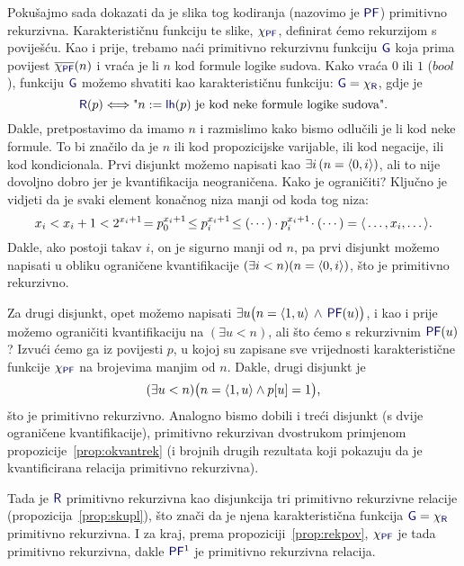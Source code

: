 \begin{primjer}[{name=[primitivna rekurzivnost skupa svih formula logike sudova]}]
Pokušajmo sada dokazati da je slika tog kodiranja (nazovimo je $\f{PF}$) primitivno rekurzivna. Karakterističnu funkciju te slike, $\chi_{\f{PF}}$, definirat ćemo rekurzijom s poviješću. Kao i prije, trebamo naći primitivno rekurzivnu funkciju $\f G$ koja prima povijest $\overline{\chi_{\f{PF}}}(n)$ i vraća je li $n$ kod formule logike sudova. Kako vraća $0$ ili $1$ ($bool$), funkciju $\f G$ možemo shvatiti kao karakterističnu funkciju: $\f G=\chi_{\f R}$, gdje je
\begin{equation}
    \f R(p)\Longleftrightarrow\text{"$n:=\f{lh}(p)$ je kod neke formule logike sudova".}
\end{equation}
	Dakle, pretpostavimo da imamo $n$ i razmislimo kako bismo odlučili je li kod neke formule. To bi značilo da je $n$ ili kod propozicijske varijable, ili kod negacije, ili kod kondicionala. Prvi disjunkt možemo napisati kao $\exists i\,(n=\langle0,i\rangle)$, ali to nije dovoljno dobro jer je kvantifikacija neograničena. Kako je ograničiti? Ključno je vidjeti da je svaki element konačnog niza manji od koda tog niza:
\begin{equation}\label{eq:elem<kod}
    x_i<x_i+1<2^{x_i+1}\!=p_0^{x_i+1}\!\le p_i^{x_i+1}\!\le(\cdots)\cdot p_i^{x_i+1}\!\cdot(\cdots)=\langle\,\dotsc,x_i,\dotsc\rangle\text.
\end{equation}
Dakle, ako postoji takav $i$, on je sigurno manji od $n$, pa prvi disjunkt možemo napisati u obliku ograničene kvantifikacije $(\exists i<n)(n=\langle0,i\rangle)$, što je primitivno rekurzivno.

    Za drugi disjunkt, opet možemo napisati $\exists u\bigl(n\eq\langle1,u\rangle\,\land\,\f{PF}(u)\bigr)$, i kao i prije možemo ograničiti kvantifikaciju na $(\exists u<n)$, ali što ćemo s rekurzivnim $\f{PF}(u)$? Izvući ćemo ga iz povijesti $p$, u kojoj su zapisane sve vrijednosti karakteristične funkcije $\chi_{\f{PF}}$ na brojevima manjim od $n$. Dakle, drugi disjunkt je
\begin{equation}
    (\exists u<n)\bigl(n=\langle1,u\rangle\land p[u]=1\bigr)\text,
\end{equation}
što je primitivno rekurzivno. Analogno bismo dobili i treći disjunkt (s dvije ograničene kvantifikacije),  primitivno rekurzivan dvostrukom primjenom propozicije~\ref{prop:okvantrek} (i brojnih drugih rezultata koji pokazuju da je kvantificirana relacija primitivno rekurzivna).

Tada je $\f R$ primitivno rekurzivna kao disjunkcija tri primitivno rekurzivne relacije (propozicija~\ref{prop:skupl}), što znači da je njena karakteristična funkcija $\f G=\chi_{\f R}$ primitivno rekurzivna. I za kraj, prema propoziciji~\ref{prop:rekpov}, $\chi_{\f{PF}}$ je tada primitivno rekurzivna, dakle $\f{PF}^1$ je primitivno rekurzivna relacija.
\end{primjer}

